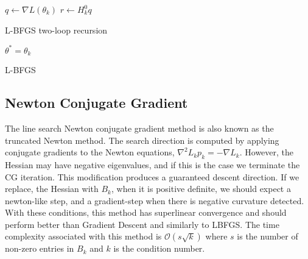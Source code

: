 \documentclass{article}
\begin{document}
\begin{algorithm}[H]
\SetAlgoLined
{} 
 $q \gets \nabla L(\theta_k)$\;
 $r \gets H_k^0 q$\;
 \caption{L-BFGS two-loop recursion}
\end{algorithm}

\begin{algorithm}[H]
\SetAlgoLined
\KwResult{$\theta^{*}$ } 
 $\theta^* = \theta_k$\;
 \caption{L-BFGS}
\end{algorithm}

\subsection{Newton Conjugate Gradient}

The line search Newton conjugate gradient method is also known as the truncated Newton method. The search direction is computed by applying conjugate gradients to the Newton equations, $\nabla^2 L_k p_k = -\nabla L_k$. However, the Hessian may have negative eigenvalues, and if this is the case we terminate the CG iteration. This modification produces a guaranteed descent direction. If we replace, the Hessian with $B_k$, when it is positive definite, we should expect a newton-like step, and a gradient-step when there is negative curvature detected. With these conditions, this method has superlinear convergence and should perform better than Gradient Descent and similarly to LBFGS. The time complexity associated with this method is $\mathcal{O}(s\sqrt{k})$ where $s$ is the number of non-zero entries in $B_k$ and $k$ is the condition number.
\end{document}
